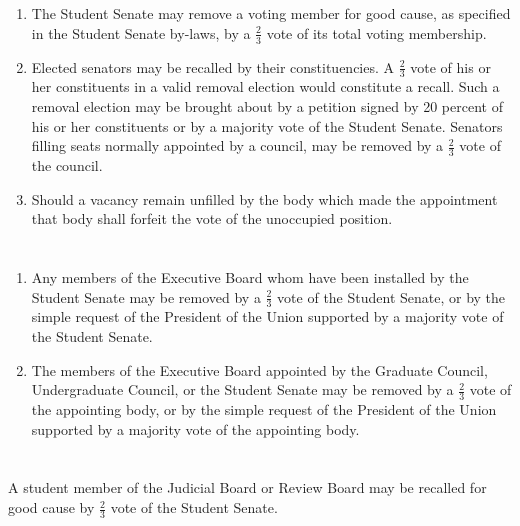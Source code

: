 \documentclass[12pt]{constitution}
\begin{document}
\section{}
\begin{enumerate}
\item The Student Senate may remove a voting member for good cause, as specified in the Student
Senate by-laws, by a $\frac{2}{3}$ vote of its total voting membership.
\item Elected senators may be recalled by their constituencies. A $\frac{2}{3}$ vote of his or her constituents in
a valid removal election would constitute a recall. Such a removal election may be brought
about by a petition signed by 20 percent of his or her constituents or by a majority vote of the
Student Senate. Senators filling seats normally appointed by a council, may be removed by a
$\frac{2}{3}$ vote of the council.
\item Should a vacancy remain unfilled by the body which made the appointment that body shall
forfeit the vote of the unoccupied position.
\end{enumerate}

\section{}
\begin{enumerate}
\item Any members of the Executive Board whom have been installed by the Student Senate may be
removed by a $\frac{2}{3}$ vote of the Student Senate, or by the simple request of the President of the
Union supported by a majority vote of the Student Senate.
\item The members of the Executive Board appointed by the Graduate Council, Undergraduate
Council, or the Student Senate may be removed by a $\frac{2}{3}$ vote of the appointing body, or by the
simple request of the President of the Union supported by a majority vote of the appointing
body.
\end{enumerate}

\section{}
A student member of the Judicial Board or Review Board may be recalled for good cause by $\frac{2}{3}$ vote of the Student Senate.
\end{document}
